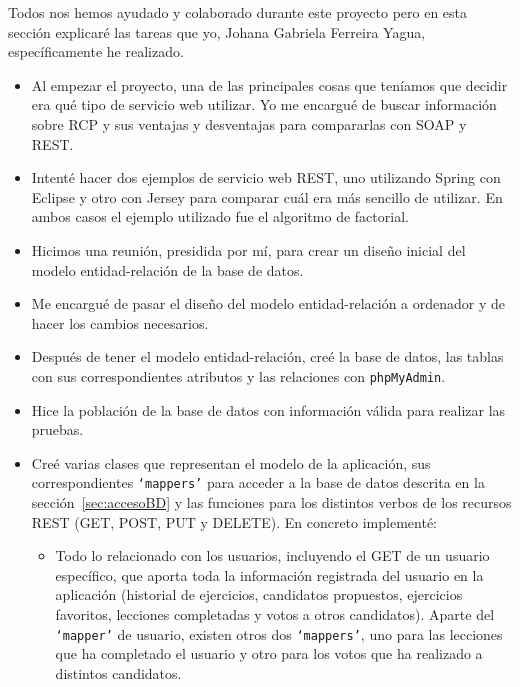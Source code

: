 
Todos nos hemos ayudado y colaborado durante este proyecto pero en esta sección explicaré las tareas que yo, Johana Gabriela Ferreira Yagua, específicamente he realizado.

\begin{itemize}
\item
Al empezar el proyecto, una de las principales cosas que teníamos que decidir era qué tipo de servicio web utilizar. Yo me encargué de buscar información sobre RCP y sus ventajas y desventajas para compararlas con SOAP y REST.

\item
Intenté hacer dos ejemplos de servicio web REST, uno utilizando Spring con Eclipse y otro con Jersey para comparar cuál era más sencillo de utilizar. En ambos casos el ejemplo utilizado fue el algoritmo de factorial.

\item
Hicimos una reunión, presidida por mí, para crear un diseño inicial del modelo entidad-relación de la base de datos.

\item
Me encargué de pasar el diseño del modelo entidad-relación a ordenador y de hacer los cambios necesarios.

\item
Después de tener el modelo entidad-relación, creé la base de datos, las tablas con sus correspondientes atributos y las relaciones con \texttt{phpMyAdmin}.

\item
Hice la población de la base de datos con información válida para realizar las pruebas.

\item
Creé varias clases que representan el modelo de la aplicación, sus correspondientes \texttt{`mappers'} para acceder a la base de datos descrita en la sección~\ref{sec:accesoBD} y las funciones para los distintos verbos de los recursos REST (GET, POST, PUT y DELETE). En concreto implementé:

\begin{itemize}
\item
Todo lo relacionado con los usuarios, incluyendo el GET de un usuario específico, que aporta toda la información registrada del usuario en la aplicación (historial de ejercicios, candidatos propuestos, ejercicios favoritos, lecciones completadas y votos a otros candidatos). Aparte del \texttt{`mapper'} de usuario, existen otros dos \texttt{`mappers'}, uno para las lecciones que ha completado el usuario y otro para los votos que ha realizado a distintos candidatos.


\end{itemize}
\end{itemize}
